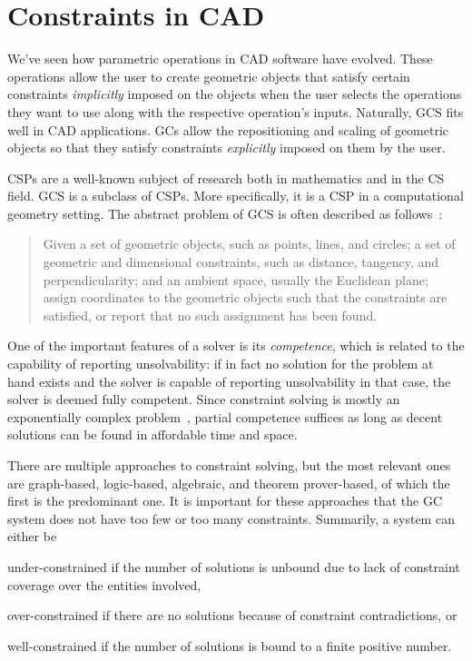 \section{Constraints in \acs{CAD}}%
\label{sec:intro.constraints}

We've seen how parametric operations in \ac{CAD} software have evolved.  These
operations allow the user to create geometric objects that satisfy certain
constraints \textit{implicitly} imposed on the objects when the user selects the
operations they want to use along with the respective operation's inputs.
Naturally, \ac{GCS} fits well in \ac{CAD} applications.  \Acp{GC} allow the
repositioning and scaling of geometric objects so that they satisfy constraints
\textit{explicitly} imposed on them by the user.

\acp{CSP} are a well-known subject of research both in mathematics and in the
\ac{CS} field.  \ac{GCS} is a subclass of \acp{CSP}. More specifically, it is a
\ac{CSP} in a computational geometry setting.  The abstract problem of \ac{GCS}
is often described as follows~\cite{Bettig:2011:GCSPC}:

\begin{quote}
  Given a set of geometric objects, such as points, lines, and circles; a set of
  geometric and dimensional constraints, such as distance, tangency, and
  perpendicularity; and an ambient space, usually the Euclidean plane; assign
  coordinates to the geometric objects such that the constraints are satisfied,
  or report that no such assignment has been found.
\end{quote}

One of the important features of a solver is its \textit{competence}, which is
related to the capability of reporting unsolvability: if in fact no solution for
the problem at hand exists and the solver is capable of reporting unsolvability
in that case, the solver is deemed fully competent.  Since constraint solving is
mostly an exponentially complex problem~\cite{Rossi:2006:Handbook}, partial
competence suffices as long as decent solutions can be found in affordable time
and space.

There are multiple approaches to constraint solving, but the most relevant ones
are graph-based, logic-based, algebraic, and theorem prover-based, of which the
first is the predominant one.  It is important for these approaches that the
\ac{GC} system does not have too few or too many constraints.  Summarily, a
system can either be 
\begin{enumerate*}[label= (\arabic*)]
  \item under-constrained if the number of solutions is unbound due to lack of
  constraint coverage over the entities involved,
  \item over-constrained if there are no solutions because of constraint
  contradictions, or
  \item well-constrained if the number of solutions is bound to a finite
  positive number.
\end{enumerate*}

